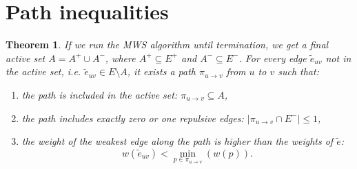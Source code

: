 \documentclass[12pt]{article}
\newtheorem{theorem}{Theorem}[section]
\begin{document}
\section{Path inequalities}
\begin{theorem}
If we run the MWS algorithm until termination, we get a final active set ${A = A^{+} \cup A^{-}}$, where $A^{+} \subseteq E^+$ and $A^{-} \subseteq E^-$. For every edge $\tilde{e}_{uv}$ not in the active set, i.e. $\tilde{e}_{uv} \in E\setminus A$, it exists a path $\pi_{u \rightarrow v}$ from $u$ to $v$ such that:
\begin{enumerate}
\item the path is included in the active set: $\pi_{u \rightarrow v} \subseteq A$,  \label{cond_1} 
\item the path includes exactly zero or one repulsive edges: $\left| \pi_{u \rightarrow v} \cap E^{-}  \right| \leq 1$, \label{cond_2}
\item the weight of the weakest edge along the path is higher than the weights of $\tilde{e}$: \label{cond_3}
\[ 
w(\tilde{e}_{uv}) < \min_{p\in \pi_{u \rightarrow v}}  (w(p)).
\]
\end{enumerate} 
\end{theorem}
\end{document}
